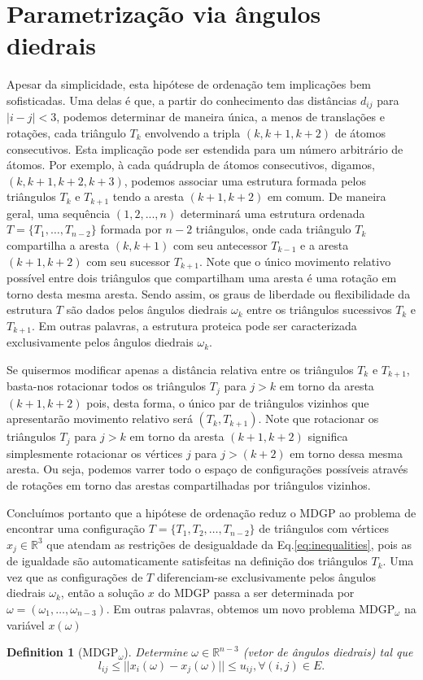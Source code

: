 \documentclass[10pt,a4paper]{article}
\newtheorem{definition}{Definition}
\newcommand{\R}{\mathbb{R}}
\begin{document}
\section{Parametrização via ângulos diedrais}\label{sec:params}
Apesar da simplicidade, esta hipótese de ordenação tem implicações bem sofisticadas. Uma delas é que, a partir do conhecimento das distâncias $d_{ij}$ para $|i-j|<3$, podemos determinar de maneira única, a menos de translações e rotações, cada triângulo $T_k$ envolvendo a tripla $(k,k+1,k+2)$ de átomos consecutivos. Esta implicação pode ser estendida para um número arbitrário de átomos. Por exemplo, à cada quádrupla de átomos consecutivos, digamos, $(k, k+1, k+2, k+3)$, podemos associar uma estrutura formada pelos triângulos $T_k$ e $T_{k+1}$ tendo a aresta $(k+1,k+2)$ em comum. De maneira geral, uma sequência $(1,2,...,n)$ determinará uma estrutura ordenada $T=\{T_1,\ldots,T_{n-2}\}$ formada por $n-2$ triângulos, onde cada triângulo $T_k$ compartilha a aresta $(k,k+1)$ com seu antecessor $T_{k-1}$ e a aresta $(k+1,k+2)$ com seu sucessor $T_{k+1}$. Note que o único movimento relativo possível entre dois triângulos que compartilham uma aresta é uma rotação em torno desta mesma aresta. Sendo assim, os graus de liberdade ou flexibilidade da estrutura $T$ são dados pelos ângulos diedrais $\omega_k$ entre os triângulos sucessivos $T_{k}$ e $T_{k+1}$. Em outras palavras, a estrutura proteica pode ser caracterizada exclusivamente pelos ângulos diedrais $\omega_k$.

Se quisermos modificar apenas a distância relativa entre os triângulos $T_{k}$ e $T_{k+1}$, basta-nos rotacionar todos os triângulos $T_j$ para $j>k$ em torno da aresta $(k+1,k+2)$ pois, desta forma, o único par de triângulos vizinhos que apresentarão movimento relativo será $(T_{k},T_{k+1})$. Note que rotacionar os triângulos $T_j$ para $j>k$ em torno da aresta $(k+1,k+2)$ significa simplesmente rotacionar os vértices $j$ para $j>(k+2)$ em torno dessa mesma aresta. Ou seja, podemos varrer todo o espaço de configurações possíveis através de rotações em torno das arestas compartilhadas por triângulos vizinhos.

Concluímos portanto que a hipótese de ordenação reduz o MDGP ao problema de encontrar uma configuração $T=\{T_1,T_2,\ldots,T_{n-2}\}$ de triângulos com vértices $x_j\in\R^{3}$ que atendam as restrições de desigualdade da Eq.\eqref{eq:inequalities}, pois as de igualdade são automaticamente satisfeitas na definição dos triângulos $T_k$. Uma vez que as configurações de $T$ diferenciam-se exclusivamente pelos ângulos diedrais $\omega_k$, então a solução $x$ do MDGP passa a ser determinada por $\omega=(\omega_1,\ldots,\omega_{n-3})$. Em outras palavras, obtemos um novo problema $\mbox{MDGP}_\omega$ na variável $x(\omega)$
\begin{definition}[MDGP$_\omega$]
	Determine $\omega \in \R^{n-3}$ (vetor de ângulos diedrais) tal que
	$$l_{ij} \leq ||x_i(\omega) - x_j(\omega)|| \leq u_{ij}, \forall (i,j) \in E.$$
\end{definition}
\end{document}
